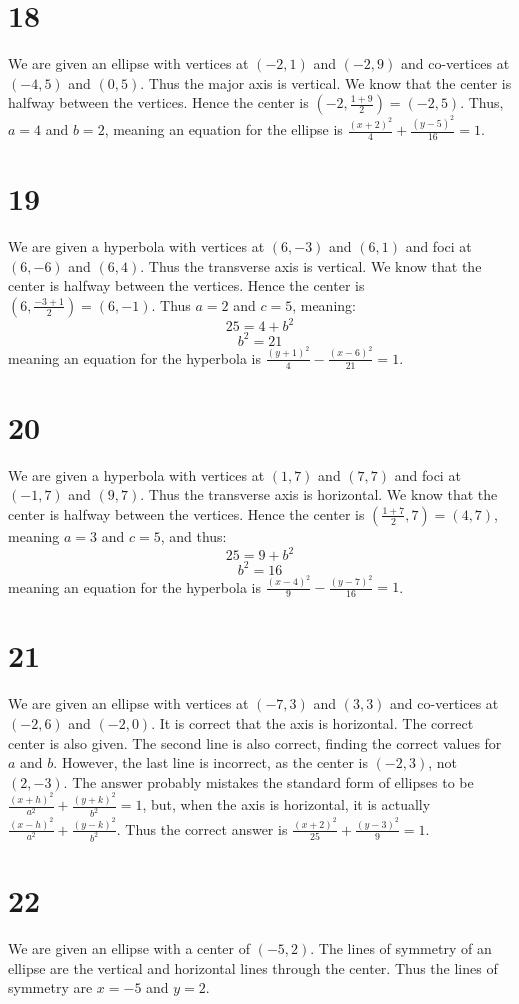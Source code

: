 \documentclass{article}
\theoremstyle{definition}
\newcommand{\?}{\stackrel{?}{=}}
\begin{document}
\section*{18}
We are given an ellipse with vertices at $(-2,1)$ and $(-2,9)$ and co-vertices at $(-4,5)$ and $(0,5)$. Thus the major axis is vertical. We know that 
the center is halfway between the vertices. Hence the center is $(-2,\frac{1+9}{2})=(-2,5)$. Thus, $a=4$ and $b=2$, meaning an equation for the ellipse is
$\frac{(x+2)^2}{4}+\frac{(y-5)^2}{16}=1$.

\section*{19}
We are given a hyperbola with vertices at $(6,-3)$ and $(6,1)$ and foci at $(6,-6)$ and $(6,4)$. Thus the transverse axis is vertical. We know that the center is 
halfway between the vertices. Hence the center is $(6,\frac{-3+1}{2})=(6,-1)$. Thus $a=2$ and $c=5$, meaning:
\[ 25=4+b^2 \] \[ b^2=21 \] meaning an equation for the hyperbola is $\frac{(y+1)^2}{4}-\frac{(x-6)^2}{21}=1$.

\section*{20}
We are given a hyperbola with vertices at $(1,7)$ and $(7,7)$ and foci at $(-1,7)$ and $(9,7)$. Thus the transverse axis is horizontal. We know that the center is 
halfway between the vertices. Hence the center is $(\frac{1+7}{2},7)=(4,7)$, meaning $a=3$ and $c=5$, and thus:
\[ 25=9+b^2 \] \[ b^2=16 \] meaning an equation for the hyperbola is $\frac{(x-4)^2}{9}-\frac{(y-7)^2}{16}=1$.

\section*{21}
We are given an ellipse with vertices at $(-7,3)$ and $(3,3)$ and co-vertices at $(-2,6)$ and $(-2,0)$. It is correct that the axis is horizontal. The correct center 
is also given. The second line is also correct, finding the correct values for $a$ and $b$. However, the last line is incorrect, as the center is $(-2,3)$, not 
$(2,-3)$. The answer probably mistakes the standard form of ellipses to be $\frac{(x+h)^2}{a^2}+\frac{(y+k)^2}{b^2}=1$, but, when the axis is horizontal, it is actually 
$\frac{(x-h)^2}{a^2}+\frac{(y-k)^2}{b^2}$. Thus the correct answer is $\frac{(x+2)^2}{25}+\frac{(y-3)^2}{9}=1$.

\section*{22}
We are given an ellipse with a center of $(-5,2)$. The lines of symmetry of an ellipse are the vertical and horizontal lines through the center. Thus the lines of 
symmetry are $x=-5$ and $y=2$. 
\end{document}
